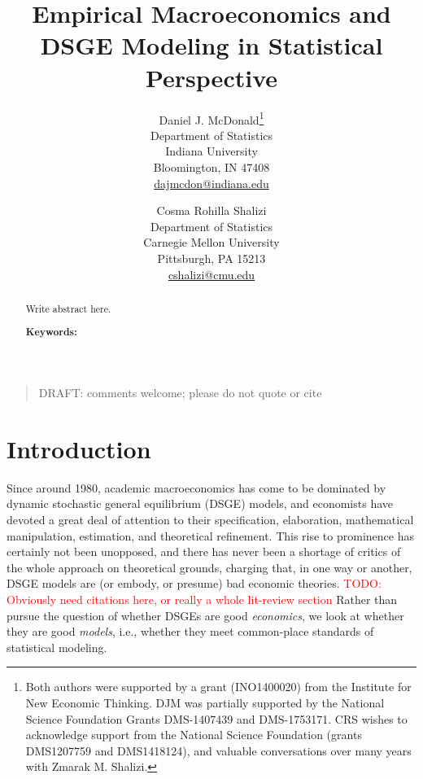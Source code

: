 \documentclass[11pt]{article}
\newcommand{\email}[1]{\href{mailto:#1}{#1}}
\newcommand{\attn}[1]{\textcolor{red}{#1}}
\begin{document}

\title{Empirical Macroeconomics and DSGE Modeling in Statistical Perspective}
\author{  
    Daniel J. McDonald\thanks{Both authors were supported by a grant (INO1400020) from the Institute
for New Economic Thinking. DJM was partially supported by the National
Science Foundation Grants DMS-1407439 and DMS-1753171. CRS wishes to
acknowledge support from the National Science Foundation (grants
DMS1207759 and DMS1418124), and valuable conversations over many years
with Zmarak M. Shalizi.}  \\
  Department of Statistics\\
Indiana University\\
Bloomington, IN 47408\\
\email{dajmcdon@indiana.edu}  
   \and   Cosma Rohilla Shalizi \\
  Department of Statistics\\
Carnegie Mellon University\\
Pittsburgh, PA 15213\\
\email{cshalizi@cmu.edu}  
  }
\date{}

\maketitle

\begin{quotation}
DRAFT: comments welcome; please do not quote or cite
\end{quotation}

\begin{abstract}
  Write abstract here. 
  
  \vspace{11pt}
  \noindent\textbf{Keywords:} 
\end{abstract}


\hypertarget{introduction}{%
\section{Introduction}\label{introduction}}

Since around 1980, academic macroeconomics has come to be dominated by
dynamic stochastic general equilibrium (DSGE) models, and economists
have devoted a great deal of attention to their specification,
elaboration, mathematical manipulation, estimation, and theoretical
refinement. This rise to prominence has certainly not been unopposed,
and there has never been a shortage of critics of the whole approach on
theoretical grounds, charging that, in one way or another, DSGE models
are (or embody, or presume) bad economic theories.
\attn{TODO: Obviously need citations here, or really
    a whole lit-review section} Rather than pursue the question of
whether DSGEs are good \emph{economics}, we look at whether they are
good \emph{models}, i.e., whether they meet common-place standards of
statistical modeling.
\end{document}
